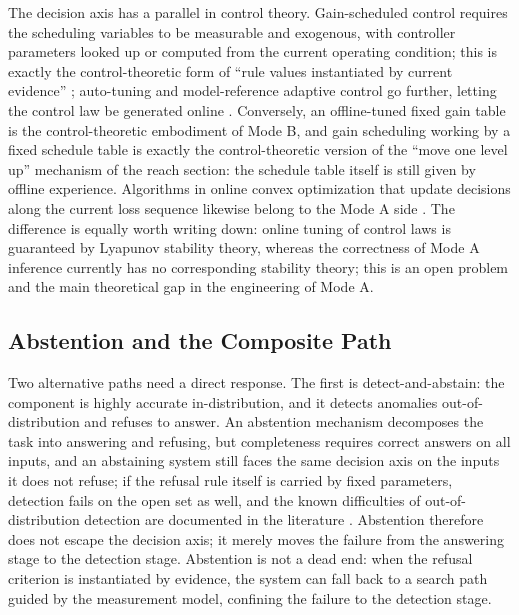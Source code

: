 The decision axis has a parallel in control theory. Gain-scheduled control requires the scheduling variables to be measurable and exogenous, with controller parameters looked up or computed from the current operating condition; this is exactly the control-theoretic form of ``rule values instantiated by current evidence'' \citep{shamma1990}; auto-tuning and model-reference adaptive control go further, letting the control law be generated online \citep{astrom1995}. Conversely, an offline-tuned fixed gain table is the control-theoretic embodiment of Mode B, and gain scheduling working by a fixed schedule table is exactly the control-theoretic version of the ``move one level up'' mechanism of the reach section: the schedule table itself is still given by offline experience. Algorithms in online convex optimization that update decisions along the current loss sequence likewise belong to the Mode A side \citep{hazan2016}. The difference is equally worth writing down: online tuning of control laws is guaranteed by Lyapunov stability theory, whereas the correctness of Mode A inference currently has no corresponding stability theory; this is an open problem and the main theoretical gap in the engineering of Mode A.

\subsection{Abstention and the Composite Path}

Two alternative paths need a direct response. The first is detect-and-abstain: the component is highly accurate in-distribution, and it detects anomalies out-of-distribution and refuses to answer. An abstention mechanism decomposes the task into answering and refusing, but completeness requires correct answers on all inputs, and an abstaining system still faces the same decision axis on the inputs it does not refuse; if the refusal rule itself is carried by fixed parameters, detection fails on the open set as well, and the known difficulties of out-of-distribution detection are documented in the literature \citep{hendrycks2016}. Abstention therefore does not escape the decision axis; it merely moves the failure from the answering stage to the detection stage. Abstention is not a dead end: when the refusal criterion is instantiated by evidence, the system can fall back to a search path guided by the measurement model, confining the failure to the detection stage.

